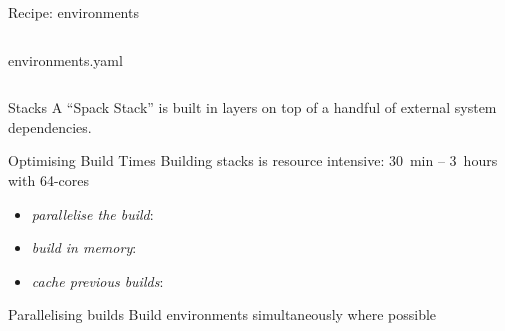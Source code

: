 \documentclass[aspectratio=43]{beamer}
\begin{document}
\begin{frame}[fragile]{Recipe: environments}

    \begin{columns}[T]
        \begin{column}{0.5\textwidth}
        \begin{codecolumn}{environments.yaml}

        \end{codecolumn}
        \end{column}
        \begin{column}{0.5\textwidth}
        \begin{codecolumnnotitle}{}

        \end{codecolumnnotitle}
        \end{column}
    \end{columns}

\end{frame}

\begin{frame}[fragile]{Stacks}
    A ``Spack Stack'' is built in layers on top of a handful of external system dependencies.
    \begin{center}
        
    \end{center}
\end{frame}

\begin{frame}[fragile]{Optimising Build Times}
    Building stacks is resource intensive: 30~min -- 3~hours with 64-cores

    \begin{itemize}
        \item \emph{parallelise the build}:
        \item \emph{build in memory}:
        \item \emph{cache previous builds}:
    \end{itemize}
\end{frame}

\begin{frame}[fragile]{Parallelising builds}
    Build environments simultaneously where possible
    \begin{center}
        
    \end{center}
\end{frame}
\end{document}
